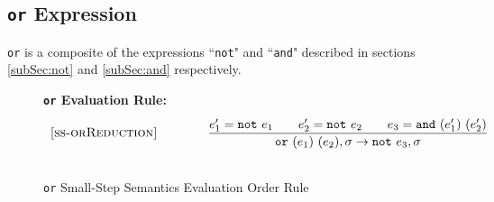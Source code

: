 \documentclass{article}
\newcommand{\note}[1]{\mbox{\tt not}~#1}
\newcommand{\ande}[2]{\mbox{\tt and}~(#1)~(#2)}
\newcommand{\ore}[2]{\mbox{\tt or}~(#1)~(#2)}
\begin{document}
\subsection{{\tt or} Expression}

{\tt or} is a composite of the expressions ``{\tt not}" and ``{\tt and}" described in sections \ref{subSec:not} and \ref{subSec:and} respectively.

\begin{figure}[H]
\caption{{\tt or} Small-Step Semantics Evaluation Order Rule}
\label{fig:orRules}
{\bf {\tt or} Evaluation Rule:} 
\[
\\
\begin{array}{r@{\qquad\qquad}l}
\ssrule{ss-orReduction}{
  e_1'=\note{e_1} \qquad e_2'=\note{e_2} \qquad e_3=\ande{e_1'}{e_2'}
}{
  \sstep{\ore{e_1}{e_2}}{\sigma}{\note{e_3}}{\sigma}
}
\end{array}
\]
\end{figure}
\end{document}
